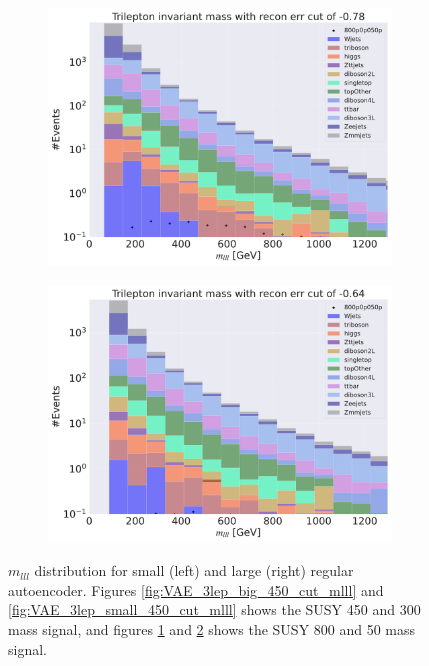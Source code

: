 \begin{figure}[H]
    \hfill
    \begin{subfigure}{.45\textwidth}
        \includegraphics[width=\textwidth]{Figures/VAE_testing/big/3lep/b_data_recon_big_rm3_feats_sig_800p0p050p_mlll_recon_errcut_-0.78.pdf}
        \caption{}
        \label{fig:VAE_3lep_big_800_cut_mlll}
    \end{subfigure}
    \hfill   
    \begin{subfigure}{.45\textwidth}
        \includegraphics[width=\textwidth]{Figures/VAE_testing/small/3lep/b_data_recon_big_rm3_feats_sig_800p0p050p_mlll_recon_errcut_-0.64.pdf}
        \caption{}
        \label{fig:VAE_3lep_small_800_cut_mlll}
    \end{subfigure}
    \hfill      
    \caption[Some $m_{lll}$ cuts for VAE]{$m_{lll}$ distribution for small (left) and large (right) regular autoencoder.
    Figures \ref{fig:VAE_3lep_big_450_cut_mlll} and \ref{fig:VAE_3lep_small_450_cut_mlll} shows the SUSY 450 and 300 mass signal, 
    and figures \ref{fig:VAE_3lep_big_800_cut_mlll} and \ref{fig:VAE_3lep_small_800_cut_mlll} shows the SUSY 800 and 50 mass signal.}
    \label{fig:VAE_3lep_recon_err_both_sig_cut_mlll}
\end{figure}


